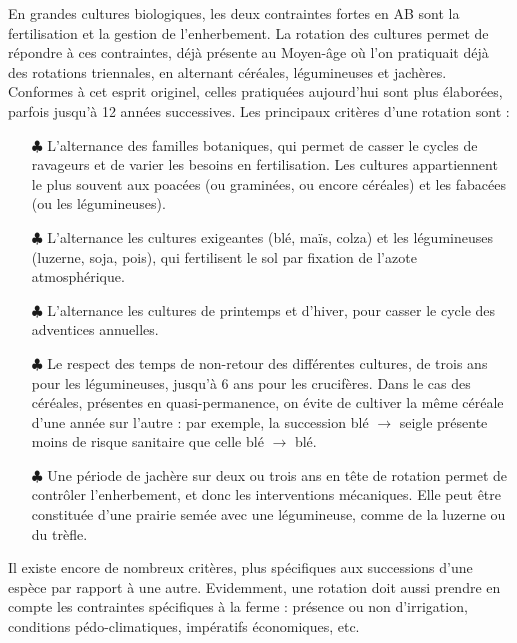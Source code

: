 \documentclass{book}
\begin{document}
En grandes cultures biologiques, les deux contraintes fortes en AB sont la fertilisation et la gestion de l'enherbement. La rotation des cultures permet de répondre à ces contraintes, déjà présente au Moyen-âge où l'on pratiquait déjà des rotations triennales, en alternant céréales, légumineuses et jachères. Conformes à cet esprit originel, celles pratiquées aujourd'hui sont plus élaborées, parfois jusqu'à 12 années successives. Les principaux critères d'une rotation sont :
\begin{itemize}

	\item[$\clubsuit$] L'alternance des familles botaniques, qui permet de casser le cycles de ravageurs et de varier les besoins en fertilisation. Les cultures appartiennent le plus souvent aux poacées (ou graminées, ou encore céréales) et les fabacées (ou les légumineuses). 

	\item[$\clubsuit$] L'alternance les cultures exigeantes (blé, maïs, colza) et les légumineuses (luzerne, soja, pois), qui fertilisent le sol par fixation de l'azote atmosphérique. 
	
	\item[$\clubsuit$] L'alternance les cultures de printemps et d'hiver, pour casser le cycle des adventices annuelles.
	
	\item[$\clubsuit$] Le respect des temps de non-retour des différentes cultures, de trois ans pour les légumineuses, jusqu'à 6 ans pour les crucifères. Dans le cas des céréales, présentes en quasi-permanence, on évite de cultiver la même céréale d'une année sur l'autre : par exemple, la succession blé $\rightarrow$ seigle présente moins de risque sanitaire que celle blé $\rightarrow$ blé.
	
	\item[$\clubsuit$] Une période de jachère sur deux ou trois ans en tête de rotation permet de contrôler l'enherbement, et donc les interventions mécaniques. Elle peut être constituée d'une prairie semée avec une légumineuse, comme de la luzerne ou du trèfle.

\end{itemize}

Il existe encore de nombreux critères, plus spécifiques aux successions d'une espèce par rapport à une autre. Evidemment, une rotation doit aussi prendre en compte les contraintes spécifiques à la ferme : présence ou non d'irrigation, conditions pédo-climatiques, impératifs économiques, etc.
\end{document}
